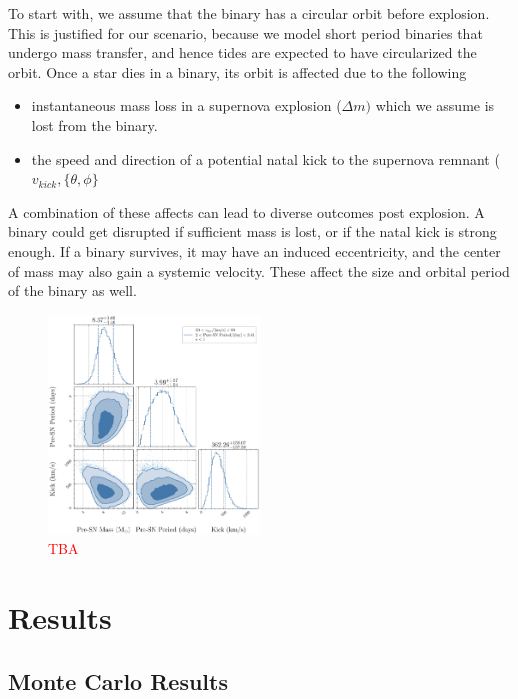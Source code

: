 \documentclass[linenumbers,trackchanges,twocolumn]{aastex701}
\newcommand{\red}{\textcolor{red}}
\begin{document}
To start with, we assume that the binary has a circular orbit before explosion. This is justified for our scenario, because we model short period binaries that undergo mass transfer, and hence tides are expected to have circularized the orbit. Once a star dies in a binary, its orbit is affected due to the following

\begin{itemize}
    \item instantaneous mass loss in a supernova explosion ($\Delta m)$ which we assume is lost from the binary.
    \item the speed and direction of a potential natal kick to the supernova remnant ($v_{kick}, \{\theta,\phi\}$
\end{itemize}

A combination of these affects can lead to diverse outcomes post explosion. A binary could get disrupted if sufficient mass is lost, or if the natal kick is strong enough. If a binary survives, it may have an induced eccentricity, and the center of mass may also gain a systemic velocity. These affect the size and orbital period of the binary as well.

\begin{figure}[htbp]
    \centering
    \includegraphics[width=0.5\textwidth]{xrb-monte-carlo-mass-period-kick.pdf}
    \caption{\red{TBA}}
    \label{fig:xrb_monte_carlo}
\end{figure}

\section{Results}

\subsection{Monte Carlo Results}
\end{document}
